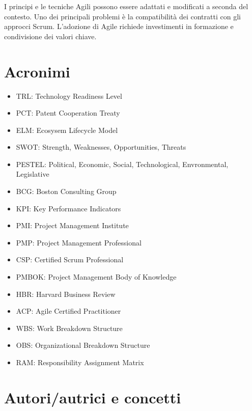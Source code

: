 \documentclass[answers, a4paper, 11pt]{exam}
\begin{document}
I principi e le tecniche Agili possono essere adattati e modificati a seconda del contesto.
Uno dei principali problemi è la compatibilità dei contratti con gli approcci Scrum.
L'adozione di Agile richiede investimenti in formazione e condivisione dei valori chiave.

\section{Acronimi}
\begin{itemize}
    \item TRL: Technology Readiness Level
    \item PCT: Patent Cooperation Treaty
    \item ELM: Ecosysem Lifecycle Model
    \item SWOT: Strength, Weaknesses, Opportunities, Threats
    \item PESTEL: Political, Economic, Social, Technological, Envronmental, Legislative
    \item BCG: Boston Consulting Group
    \item KPI: Key Performance Indicators
    \item PMI: Project Management Institute
    \item PMP: Project Management Professional
    \item CSP: Certified Scrum Professional
    \item PMBOK: Project Management Body of Knowledge
    \item HBR: Harvard Business Review
    \item ACP: Agile Certified Practitioner
    \item WBS: Work Breakdown Structure
    \item OBS: Organizational Breakdown Structure
    \item RAM: Responsibility Assignment Matrix
\end{itemize}

\section{Autori/autrici e concetti}
\end{document}
